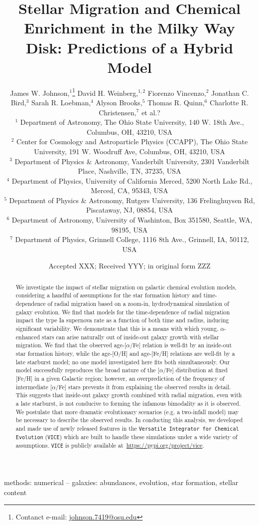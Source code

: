 \documentclass[fleqn, usenatbib]{mnras}
\title[Stellar Migration and Chemical Enrichment]{Stellar Migration and 
Chemical Enrichment in the Milky Way Disk: Predictions of a Hybrid Model}
\author[J.W. Johnson et al.]{
	James W. Johnson,$^{1}$\thanks{Contanct e-mail: \href{mailto:
	johnson.7419@osu.edu}{johnson.7419@osu.edu}} 
	David H. Weinberg,$^{1, 2}$ 
	Fiorenzo Vincenzo,$^{2}$ 
	Jonathan C. Bird,$^{3}$ 
	\newauthor 
	Sarah R. Loebman,$^{4}$ 
	Alyson Brooks,$^{5}$ 
	Thomas R. Quinn,$^{6}$ 
	Charlotte R. Christensen,$^{7}$ 
	\newauthor 
	et al.?
	\\
	$^{1}$ Department of Astronomy, The Ohio State University, 
	140 W. 18th Ave., Columbus, OH, 43210, USA 
	\\ 
	$^{2}$ Center for Cosmology and Astroparticle Physics (CCAPP), 
	The Ohio State University, 191 W. Woodruff Ave, Columbus, OH, 43210, USA 
	\\ 
	$^{3}$ Department of Physics \& Astronomy, Vanderbilt University, 
	2301 Vanderbilt Place, Nashville, TN, 37235, USA 
	\\ 
	$^{4}$ Department of Physics, University of California Merced, 
	5200 North Lake Rd., Merced, CA, 95343, USA 
	\\ 
	$^{5}$ Department of Physics \& Astronomy, Rutgers University, 136 
	Frelinghuysen Rd, Piscataway, NJ, 08854, USA 
	\\ 
	$^{6}$ Department of Astronomy, University of Washinton, Box 351580, 
	Seattle, WA, 98195, USA 
	\\ 
	$^{7}$ Department of Physics, Grinnell College, 1116 8th Ave., Grinnell, 
	IA, 50112, USA 
}
\date{Accepted XXX; Received YYY; in original form ZZZ}
\begin{document}
 
\label{firstpage} 
\pagerange{\pageref{firstpage}--\pageref{lastpage}} 
\maketitle 

\begin{abstract} 
We investigate the impact of stellar migration on galactic chemical evolution 
models, considering a handful of assumptions for the star formation history 
and time-dependence of radial migration based on a zoom-in, hydrodynamical 
simulation of galaxy evolution. We find that models for the 
time-dependence of radial migration impact the type Ia supernova rate as a 
function of both time and radius, inducing significant variability. We 
demonstrate that this is a means with which young, $\alpha$-enhanced stars can 
arise naturally out of inside-out galaxy growth with stellar migration. We find 
that the observed age-[$\alpha$/Fe] relation is well-fit by an inside-out star 
formation history, while the age-[O/H] and age-[Fe/H] relations are well-fit by 
a late starburst model; no one model investigated here fits both 
simultaneously. Our model successfully reproduces the broad nature of the 
[$\alpha$/Fe] distribution at fixed [Fe/H] in a given Galactic region; however, 
an overprediction of the frequency of intermediate [$\alpha$/Fe] stars prevents 
it from explaining the observed results in detail. This suggests 
that inside-out galaxy growth combined with radial migration, even with a late 
starburst, is not conducive to forming the infamous bimodality as it is 
observed. We postulate that more dramatic evolutionary scenarios (e.g. a 
two-infall model) may be necessary to describe the observed results. In 
conducting this analysis, we developed and made use of newly released features 
in the \texttt{Versatile Integrator for Chemical Evolution} (\texttt{VICE}) 
which are built to handle these simulations under a wide variety of 
assumptions. \texttt{VICE} is publicly available 
at~\url{https://pypi.org/project/vice}. 
\end{abstract} 

\begin{keywords} 
methods: numerical -- galaxies: abundances, evolution, star formation, stellar 
content 
\end{keywords} 
\end{document}

